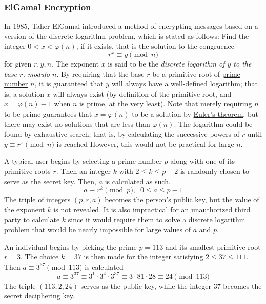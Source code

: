 \documentclass{article}
\newcounter{theorem}[section]
\newcounter{definition}[section]
\newcounter{example}[section]
\begin{document}
\subsubsection{ElGamal Encryption}
In 1985, Taher ElGamal introduced a method of encrypting messages based on a version of the discrete logarithm problem, which is stated as follows: Find the integer $0 < x < \varphi(n)$, if it exists, that is the solution to the congruence
\begin{equation}
  r^x \equiv y \pmod{n}
\end{equation}
for given $r, y, n$. The exponent $x$ is said to be the \textit{discrete logarithm of $y$ to the base $r$, modulo $n$}. By requiring that the base $r$ be a primitive root of \hyperref[def:prime-number]{prime number} $n$, it is guaranteed that $y$ will always have a well-defined logarithm; that is, a solution $x$ will always exist (by definition of the primitive root, and $x = \varphi(n) - 1$ when $n$ is prime, at the very least). Note that merely requiring $n$ to be prime guarantees that $x = \varphi(n)$ to be a solution by \hyperref[thm:eulers-theorem]{Euler's theorem}, but there may exist no solutions that are less than $\varphi(n)$. The logarithm could be found by exhaustive search; that is, by calculating the successive powers of $r$ until $y \equiv r^x \pmod{n}$ is reached However, this would not be practical for large $n$. 

A typical user begins by selecting a prime number $p$ along with one of its primitive roots $r$. Then an integer $k$ with $2 \leq k \leq p-2$ is randomly chosen to serve as the secret key. Then, $a$ is calculated as such. 
\begin{equation}
  a \equiv r^k \pmod{p}, \;\; 0 \leq a \leq p-1
\end{equation}
The triple of integers $(p, r, a)$ becomes the person's public key, but the value of the exponent $k$ is not revealed. It is also impractical for an unauthorized third party to calculate $k$ since it would require them to solve a discrete logarithm problem that would be nearly impossible for large values of $a$ and $p$. 

\begin{example}
  \label{ex:setting-up-an-elgamal-key}
An individual begins by picking the prime $p = 113$ and its smallest primitive root $r=3$. The choice $k=37$ is then made for the integer satisfying $2 \leq 37 \leq 111$. Then $a \equiv 3^{37} \pmod{113}$ is calculated 
\begin{equation}
  a \equiv 3^{37} \equiv 3^1 \cdot 3^4 \cdot 3^{37} \equiv 3 \cdot 81 \cdot 28 \equiv 24 \pmod{113}
\end{equation}
The triple $(113, 2, 24)$ serves as the public key, while the integer $37$ becomes the secret deciphering key. 
\end{example}
\end{document}
